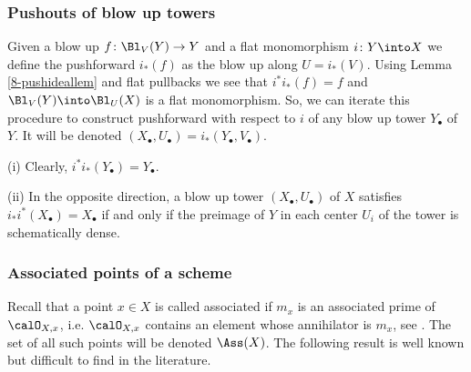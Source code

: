 \documentclass[10pt]{../fichiers-configuration-latex/smfart}
\begin{document}
\subsubsection{Pushouts of blow up towers}\label{8-pushblowsec}
Given a blow up $f{\colon}\Bl_V(Y)\to Y$ and a flat monomorphism
$i{\colon}Y\into X$ we define the pushforward $i_*(f)$ as the blow
up along $U=i_*(V)$. Using Lemma \ref{8-pushideallem} and flat
pullbacks we see that $i^*i_*(f)=f$ and $\Bl_V(Y)\into\Bl_U(X)$ is
a flat monomorphism. So, we can iterate this procedure to construct
pushforward with respect to $i$ of any blow up tower $Y_\bullet$
of $Y$. It will be denoted  $(X_\bullet,U_\bullet)=i_*(Y_\bullet,V_\bullet)$.

\begin{remark2}\label{8-pushblowrem} (i) Clearly,
$i^*i_*(Y_\bullet)=Y_\bullet$.

(ii) In the opposite direction, a blow up tower $(X_\bullet,U_\bullet)$
of $X$ satisfies  $i_*i^*(X_\bullet)=X_\bullet$ if and only if the
preimage of $Y$ in each center $U_i$ of the tower is schematically
dense.  \end{remark2}

\subsubsection{Associated points of a scheme}\label{8-asschemesec}
Recall that a point $x\in X$ is called associated if $m_x$ is an
associated prime of $\calO_{X,x}$, i.e. $\calO_{X,x}$ contains an
element whose annihilator is $m_x$, see . The
set of all such points will be denoted $\Ass(X)$. The following
result is well known but difficult to find in the literature.
\end{document}
